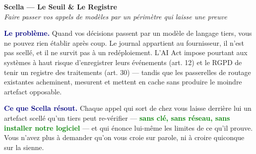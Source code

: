 \documentclass[11pt]{article}
\newcommand{\mm}[1]{\textbf{\textcolor{navy}{#1}}}
\newcommand{\ok}[1]{\textcolor{green}{\textbf{#1}}}
\begin{document}
\begin{center}
{\LARGE\bfseries\color{navy} Scella — Le Seuil \& Le Registre}\\[3pt]
{\large\color{grey}\itshape Faire passer vos appels de modèles par un périmètre qui laisse une preuve}
\end{center}
\vspace{2pt}

\begin{ouverture}
\mm{Le problème.} Quand vos décisions passent par un modèle de langage tiers, vous ne pouvez rien établir après coup. Le journal appartient au fournisseur, il n'est pas scellé, et il ne survit pas à un redéploiement. L'AI Act impose pourtant aux systèmes à haut risque d'enregistrer leurs événements (art. 12) et le RGPD de tenir un registre des traitements (art. 30) — tandis que les passerelles de routage existantes acheminent, mesurent et mettent en cache sans produire le moindre artefact opposable.

\mm{Ce que Scella résout.} Chaque appel qui sort de chez vous laisse derrière lui un artefact scellé qu'un tiers peut re-vérifier — \ok{sans clé, sans réseau, sans installer notre logiciel} — et qui énonce lui-même les limites de ce qu'il prouve. Vous n'avez plus à demander qu'on vous croie sur parole, ni à croire quiconque sur la sienne.
\end{ouverture}
\end{document}
